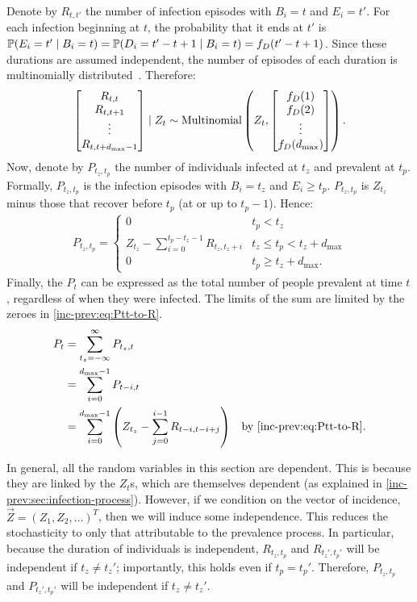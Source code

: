 \documentclass[thesis.tex]{subfiles}
\begin{document}
Denote by $R_{t,t'}$ the number of infection episodes with $B_i=t$ and $E_i=t'$.
For each infection beginning at $t$, the probability that it ends at $t'$ is $\operatorname{\mathbb{P}}(E_i = t' \mid B_i = t) = \operatorname{\mathbb{P}}(D_i = t' - t + 1 \mid B_i = t) = f_D(t' - t + 1)$.
Since these durations are assumed independent, the number of episodes of each duration is multinomially distributed~\autocite{paganoHIV}.
Therefore:
\begin{align}
\begin{bmatrix}
  R_{t,t} \\ R_{t,t+1} \\ \vdots \\ R_{t,t+d_\text{max}-1}
\end{bmatrix} \mid Z_t
\sim \operatorname{Multinomial} \left(
  Z_t, 
  \begin{bmatrix}
    f_D(1) \\ f_D(2) \\ \vdots \\ f_D(d_\text{max})
  \end{bmatrix}
\right).
\end{align}
Now, denote by $P_{t_z,t_p}$ the number of individuals infected at $t_z$ and prevalent at $t_p$.
Formally, $P_{t_z,t_p}$ is the infection episodes with $B_i = t_z$ and $E_i \geq t_p$.
$P_{t_z,t_p}$ is $Z_{t_z}$ minus those that recover before $t_p$ (\ie at or up to $t_p - 1$).
Hence:
\begin{align}
    P_{t_z,t_p} = \begin{cases}
      0 &t_p < t_z\\
      Z_{t_z} - \sum_{i=0}^{t_p-t_z-1} R_{t_z,t_z+i} &t_z \leq t_p < t_z + d_\text{max}\\
      0 &t_p \geq t_z + d_\text{max}.
  \end{cases} \label{inc-prev:eq:Ptt-to-R}
\end{align}
Finally, the $P_t$ can be expressed as the total number of people prevalent at time $t$, regardless of when they were infected.
The limits of the sum are limited by the zeroes in \cref{inc-prev:eq:Ptt-to-R}.
\begin{align}
  P_t
  &= \sum_{t_z=-\infty}^\infty P_{t_z,t} \\
  &= \sum_{i=0}^{\dmax-1} P_{t-i,t} \label{inc-prev:eq:Pt-to-Ptt} \\
  &= \sum_{i=0}^{\dmax-1} \left(Z_{t_z} - \sum_{j=0}^{i-1} R_{t-i,t-i+j} \right) &\text{by \cref{inc-prev:eq:Ptt-to-R}}\label{inc-prev:eq:Pt-to-Rtt}.
\end{align}

In general, all the random variables in this section are dependent.
This is because they are linked by the $Z_t$s, which are themselves dependent (as explained in \cref{inc-prev:sec:infection-process}).
However, if we condition on the vector of incidence, $\vec{Z} = (Z_1, Z_2, \dots)^T$, then we will induce some independence.
This reduces the stochasticity to only that attributable to the prevalence process.
In particular, because the duration of individuals is independent, $R_{t_z,t_p}$ and $R_{t_z',t_p'}$ will be independent if $t_z \neq t_z'$; importantly, this holds even if $t_p = t_p'$.
Therefore, $P_{t_z,t_p}$ and $P_{t_z',t_p'}$ will be independent if $t_z \neq t_z'$.
\end{document}
